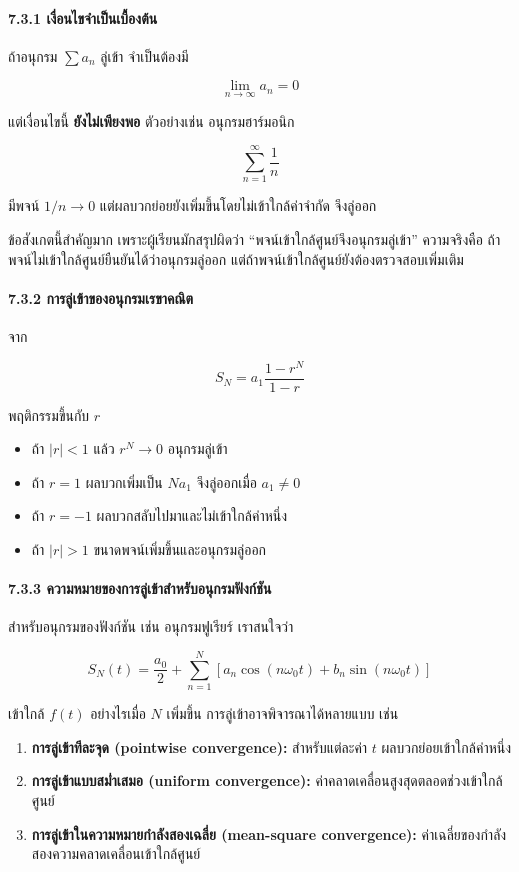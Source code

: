 \paragraph{7.3.1 เงื่อนไขจำเป็นเบื้องต้น}

ถ้าอนุกรม \(\sum a_n\) ลู่เข้า จำเป็นต้องมี

\[
\lim_{n\to\infty}a_n=0
\]

แต่เงื่อนไขนี้ \textbf{ยังไม่เพียงพอ} ตัวอย่างเช่น อนุกรมฮาร์มอนิก

\[
\sum_{n=1}^{\infty}\frac{1}{n}
\]

มีพจน์ \(1/n\to0\) แต่ผลบวกย่อยยังเพิ่มขึ้นโดยไม่เข้าใกล้ค่าจำกัด จึงลู่ออก

ข้อสังเกตนี้สำคัญมาก เพราะผู้เรียนมักสรุปผิดว่า ``พจน์เข้าใกล้ศูนย์จึงอนุกรมลู่เข้า'' ความจริงคือ ถ้าพจน์ไม่เข้าใกล้ศูนย์ยืนยันได้ว่าอนุกรมลู่ออก แต่ถ้าพจน์เข้าใกล้ศูนย์ยังต้องตรวจสอบเพิ่มเติม

\paragraph{7.3.2 การลู่เข้าของอนุกรมเรขาคณิต}

จาก

\[
S_N=a_1\frac{1-r^N}{1-r}
\]

พฤติกรรมขึ้นกับ \(r\)

\begin{itemize}
\item
  ถ้า \(|r|<1\) แล้ว \(r^N\to0\) อนุกรมลู่เข้า
\item
  ถ้า \(r=1\) ผลบวกเพิ่มเป็น \(Na_1\) จึงลู่ออกเมื่อ \(a_1\ne0\)
\item
  ถ้า \(r=-1\) ผลบวกสลับไปมาและไม่เข้าใกล้ค่าหนึ่ง
\item
  ถ้า \(|r|>1\) ขนาดพจน์เพิ่มขึ้นและอนุกรมลู่ออก
\end{itemize}

\paragraph{7.3.3 ความหมายของการลู่เข้าสำหรับอนุกรมฟังก์ชัน}

สำหรับอนุกรมของฟังก์ชัน เช่น อนุกรมฟูเรียร์ เราสนใจว่า

\[
S_N(t)=\frac{a_0}{2}+\sum_{n=1}^{N}\left[a_n\cos(n\omega_0t)+b_n\sin(n\omega_0t)\right]
\]

เข้าใกล้ \(f(t)\) อย่างไรเมื่อ \(N\) เพิ่มขึ้น การลู่เข้าอาจพิจารณาได้หลายแบบ เช่น

\begin{enumerate}
\def\labelenumi{\arabic{enumi}.}
\item
  \textbf{การลู่เข้าทีละจุด (pointwise convergence):} สำหรับแต่ละค่า \(t\) ผลบวกย่อยเข้าใกล้ค่าหนึ่ง
\item
  \textbf{การลู่เข้าแบบสม่ำเสมอ (uniform convergence):} ค่าคลาดเคลื่อนสูงสุดตลอดช่วงเข้าใกล้ศูนย์
\item
  \textbf{การลู่เข้าในความหมายกำลังสองเฉลี่ย (mean-square convergence):} ค่าเฉลี่ยของกำลังสองความคลาดเคลื่อนเข้าใกล้ศูนย์
\end{enumerate}

